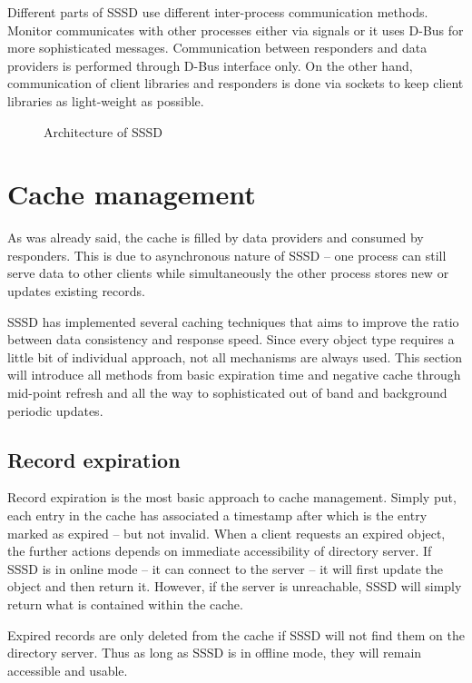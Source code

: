 Different parts of SSSD use different inter-process communication methods.
Monitor communicates with other processes either via signals or it uses D-Bus
for more sophisticated messages. Communication between responders and data
providers is performed through D-Bus interface only. On the other hand,
communication of client libraries and responders is done via sockets to keep
client libraries as light-weight as possible.

\begin{figure}[H]
  \centering
  
  \caption{Architecture of SSSD}
  \label{fig:sssd-arch}
\end{figure}

\section{Cache management}
\label{sssd:cache}

As was already said, the cache is filled by data providers and consumed by
responders. This is due to asynchronous nature of SSSD -- one process can
still serve data to other clients while simultaneously the other process stores
new or updates existing records.

SSSD has implemented several caching techniques that aims to improve the ratio
between data consistency and response speed. Since every object type requires a
little bit of individual approach, not all mechanisms are always used. This
section will introduce all methods from basic expiration time and negative cache
through mid-point refresh and all the way to sophisticated out of band and
background periodic updates.

\subsection{Record expiration}
\label{sssd:cache:expiration}

Record expiration is the most basic approach to cache management. Simply put,
each entry in the cache has associated a timestamp after which is the entry
marked as expired -- but not invalid. When a client requests an expired object,
the further actions depends on immediate accessibility of directory server. If
SSSD is in online mode -- it can connect to the server -- it will first update
the object and then return it. However, if the server is unreachable, SSSD will
simply return what is contained within the cache.

Expired records are only deleted from the cache if SSSD will not find them on
the directory server. Thus as long as SSSD is in offline mode, they will remain
accessible and usable.

